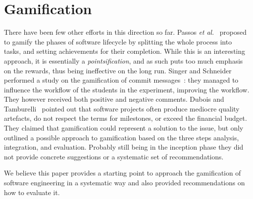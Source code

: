 \section{Gamification}\label{sec:related-gamification}

There have been few other efforts in this direction so far.
Passos \textit{et al.}~\cite{PassosMNC11} proposed to gamify the phases of software lifecycle by splitting the whole process into tasks, and setting achievements for their completion.
While this is an interesting approach, it is essentially a \emph{pointsification}, and as such puts too much emphasis on the rewards, thus being ineffective on the long run.
Singer and Schneider performed a study on the gamification of commit messages~\cite{sing2012}: they managed to influence the workflow of the students in the experiment, improving the workflow.
They however received both positive and negative comments.
Dubois and Tamburelli~\cite{Dubois2013a} pointed out that software projects often produce mediocre quality artefacts, do not respect the terms for milestones, or exceed the financial budget.
They claimed that gamification could represent a solution to the issue, but only outlined a possible approach to gamification based on the three steps analysis, integration, and evaluation.
Probably still being in the inception phase they did not provide concrete suggestions or a systematic set of recommendations.

We believe this paper provides a starting point to approach the gamification of software engineering in a systematic way and also provided recommendations on how to evaluate it.
